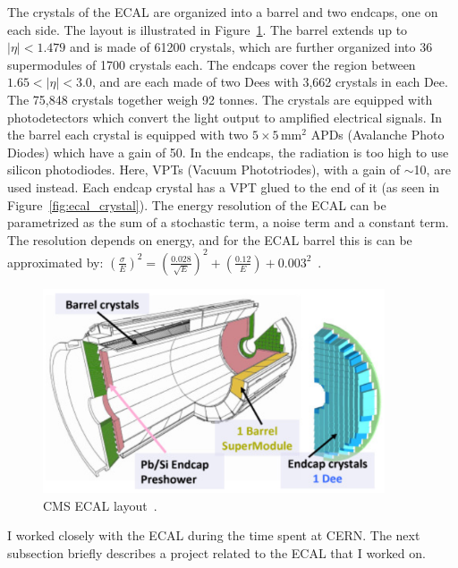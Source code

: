 The crystals of the ECAL are organized into a barrel and two endcaps, one on each side. The layout is illustrated in Figure~\ref{fig:ecal_layout}. The barrel extends up to $|\eta|<1.479$ and is made of 61200 crystals, which are further organized into 36 supermodules of 1700 crystals each. The endcaps cover the region between  $1.65<|\eta|<3.0$, and are each made of two Dees with 3,662 crystals in each Dee. The 75,848 crystals together weigh 92 tonnes. The crystals are equipped with photodetectors which convert the light output to amplified electrical signals. In the barrel each crystal is equipped with two $5\times5\,\mathrm{mm}^2$ APDs (Avalanche Photo Diodes) which have a gain of 50. In the endcaps, the radiation is too high to use silicon photodiodes. Here, VPTs (Vacuum Phototriodes), with a gain of $\sim$10, are used instead. Each endcap crystal has a VPT glued to the end of it (as seen in Figure~\ref{fig:ecal_crystal}). The energy resolution of the ECAL can be parametrized as the sum of a stochastic term, a noise term and a constant term. The resolution depends on energy, and for the ECAL barrel this is can be approximated by: $(\frac{\sigma}{E})^2=(\frac{0.028}{\sqrt{E}})^2+(\frac{0.12}{E})+0.003^2$~\cite{ecal3}.

\begin{figure}
\begin{center}
  \includegraphics[width=0.9\textwidth,keepaspectratio]{plots_and_figures/chapter3/ecal_layout.png}
\caption{CMS ECAL layout~\cite{ecal2}.}
\label{fig:ecal_layout}
\end{center}
\end{figure}

I worked closely with the ECAL during the time spent at CERN. The next subsection briefly describes a project related to the ECAL that I worked on.

